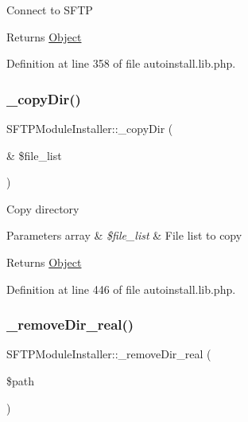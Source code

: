 Connect to S\+F\+TP

\begin{DoxyReturn}{Returns}
\hyperlink{classObject}{Object} 
\end{DoxyReturn}


Definition at line 358 of file autoinstall.\+lib.\+php.

\hypertarget{classSFTPModuleInstaller_a57832797085ca931efd64c1080186e49}{}\label{classSFTPModuleInstaller_a57832797085ca931efd64c1080186e49} 
\subsubsection{\texorpdfstring{\+\_\+copy\+Dir()}{\_copyDir()}}
{\footnotesize\ttfamily S\+F\+T\+P\+Module\+Installer\+::\+\_\+copy\+Dir (\begin{DoxyParamCaption}\item[{\&}]{\$file\+\_\+list }\end{DoxyParamCaption})}

Copy directory


\begin{DoxyParams}[1]{Parameters}
array & {\em \$file\+\_\+list} & File list to copy \\
\hline
\end{DoxyParams}
\begin{DoxyReturn}{Returns}
\hyperlink{classObject}{Object} 
\end{DoxyReturn}


Definition at line 446 of file autoinstall.\+lib.\+php.

\hypertarget{classSFTPModuleInstaller_a2acd47768689f3b71562bfc5f53ea888}{}\label{classSFTPModuleInstaller_a2acd47768689f3b71562bfc5f53ea888} 
\subsubsection{\texorpdfstring{\+\_\+remove\+Dir\+\_\+real()}{\_removeDir\_real()}}
{\footnotesize\ttfamily S\+F\+T\+P\+Module\+Installer\+::\+\_\+remove\+Dir\+\_\+real (\begin{DoxyParamCaption}\item[{}]{\$path }\end{DoxyParamCaption})}

